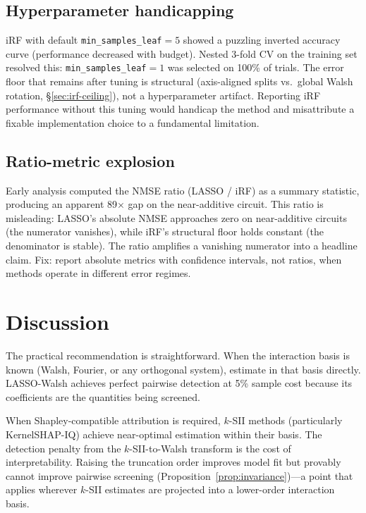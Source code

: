 \documentclass[11pt]{article}
\begin{document}
\subsection{Hyperparameter handicapping}

iRF with default \texttt{min\_samples\_leaf}$=5$ showed a puzzling
inverted accuracy curve (performance decreased with budget). Nested
3-fold CV on the training set resolved this:
\texttt{min\_samples\_leaf}$=1$ was selected on 100\% of trials.
The error floor that remains after tuning is structural
(axis-aligned splits vs.\ global Walsh rotation,
\S\ref{sec:irf-ceiling}), not a hyperparameter artifact.
Reporting iRF performance without this tuning would handicap the
method and misattribute a fixable implementation choice to a
fundamental limitation.

\subsection{Ratio-metric explosion}

Early analysis computed the NMSE ratio (LASSO / iRF) as a summary
statistic, producing an apparent 89$\times$ gap on the near-additive
circuit. This ratio is misleading: LASSO's absolute NMSE approaches
zero on near-additive circuits (the numerator vanishes), while
iRF's structural floor holds constant (the denominator is stable).
The ratio amplifies a vanishing numerator into a headline claim.
Fix: report absolute metrics with confidence intervals, not ratios,
when methods operate in different error regimes.


\section{Discussion}
\label{sec:discussion}

The practical recommendation is straightforward. When the
interaction basis is known (Walsh, Fourier, or any orthogonal
system), estimate in that basis directly. LASSO-Walsh achieves
perfect pairwise detection at 5\% sample cost because its
coefficients are the quantities being screened.

When Shapley-compatible attribution is required, $k$-SII methods
(particularly KernelSHAP-IQ) achieve near-optimal estimation
within their basis. The detection penalty from the
$k$-SII-to-Walsh transform is the cost of interpretability.
Raising the truncation order improves model fit but provably
cannot improve pairwise screening
(Proposition~\ref{prop:invariance})---a point that applies
wherever $k$-SII estimates are projected into a lower-order
interaction basis.
\end{document}
